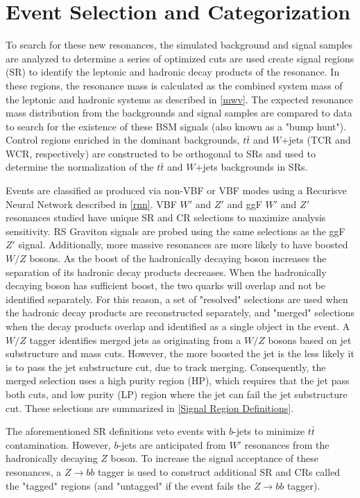 \chapter{Event Selection and Categorization}
To search for these new resonances, the simulated background and signal samples are analyzed to determine a series of optimized cuts are used create signal regions (SR) to identify the leptonic and hadronic decay products of the resonance. In these regions, the resonance mass is calculated as the combined system mass of the leptonic and hadronic systems as described in \ref{mwv}. The expected resonance mass distribution from the backgrounds and signal samples are compared to data to search for the existence of these BSM signals (also known as a "bump hunt"). Control regions enriched in the dominant backgrounds, $t\bar{t}$ and $W$+jets (TCR and WCR, respectively) are constructed to be orthogonal to SRs and used to determine the normalization of the $t\bar{t}$ and $W$+jets backgrounds in SRs.

Events are classified as produced via non-VBF or VBF modes using a Recurisve Neural Network described in \ref{rnn}. VBF $W'$ and $Z'$ and ggF $W'$ and $Z'$ resonances studied have unique SR and CR selections to maximize analysis sensitivity. RS Graviton signals are probed using the same selections as the ggF $Z'$ signal. Additionally, more massive resonances are more likely to have boosted $W/Z$ bosons. As the boost of the hadronically decaying boson increases the separation of its hadronic decay products decreases. When the hadronically decaying boson has sufficient boost, the two quarks will overlap and not be identified separately. For this reason, a set of "resolved" selections are used when the hadronic decay products are reconstructed separately, and "merged" selections when the decay products overlap and identified as a single object in the event. A $W/Z$ tagger identifies merged jets as originating from a $W/Z$ bosons based on jet substructure and mass cuts. However, the more boosted the jet is the less likely it is to pass the jet substructure cut, due to track merging. Consequently, the merged selection uses a high purity region (HP), which requires that the jet pass both cuts, and low purity (LP) region where the jet can fail the jet substructure cut. These selections are summarized in \ref{Signal Region Definitions}.

The aforementioned SR definitions veto events with $b$-jets to minimize $t\bar{t}$ contamination. However, $b$-jets are anticipated from $W'$ resonances from the hadronically decaying $Z$ boson. To increase the signal acceptance of these resonances, a $Z\rightarrow bb$ tagger is used to construct additional SR and CRs called the "tagged" regions (and "untagged" if the event fails the $Z\rightarrow bb$ tagger). 

